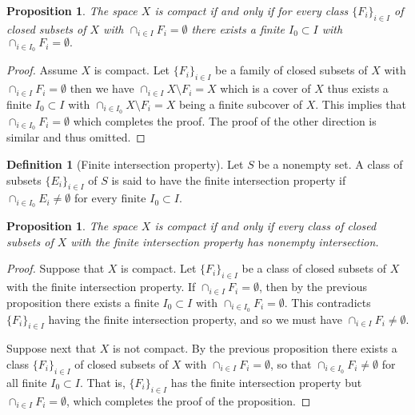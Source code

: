 \documentclass[11pt,a4paper]{article}
\theoremstyle{definition}
\newtheorem{definition}{Definition}[section]
\theoremstyle{plain}
\newtheorem{proposition}[theorem]{Proposition}
\begin{document}
  \begin{proposition}\label{prp:fip}
    The space $X$ is compact if and only if for every class 
    $\{F_i\}_{i \in I}$ of closed subsets of $X$ with 
    $\cap_{i \in I}{F_i} = \emptyset$ there exists a finite 
    $I_0 \subset I$ with $\cap_{i \in I_0} {F_i} = \emptyset.$
  \end{proposition}
  \begin{proof}
    Assume $X$ is compact. Let $\{F_i\}_{i \in I}$ be a family of closed 
    subsets of $X$ with $\cap_{i \in I}{F_i} = \emptyset$ then 
    we have
    $\cap_{i \in I} {X \setminus F_i} = X$ which is a cover of $X$
    thus exists a finite $I_0 \subset I$ with 
    $\cap_{i \in I_0} {X \setminus F_i} = X$ being a finite subcover
    of $X$. This implies that $\cap_{i \in I_0} {F_i} = \emptyset$
    which completes the proof. The proof of the other direction is
    similar and thus omitted. 
  \end{proof}

  \begin{definition}[Finite intersection property]
    Let $S$ be a nonempty set. A class of subsets $\{E_i\}_{i \in I}$ of 
    $S$ is said to have the finite intersection property if 
    $\cap_{i \in I_0}{E_i} \neq \emptyset$ for every finite 
    $I_0 \subset I$.
  \end{definition}

  \begin{proposition}
    The space $X$ is compact if and only if every class of closed
    subsets of $X$ with the finite intersection property has nonempty 
    intersection.
  \end{proposition}
  \begin{proof}
    Suppose that $X$ is compact. Let $\{F_i\}_{i \in I}$ be a class of closed 
    subsets of $X$ with the finite intersection property. 
    If $\cap_{i \in I} F_i = \emptyset$, then by the previous proposition
    there exists a finite $I_0 \subset I$ with 
    $\cap_{i \in I_0} F_i = \emptyset$. 
    This contradicts $\{F_i\}_{i \in I}$ having the finite intersection 
    property, and so we must have $\cap_{i \in I} F_i \neq \emptyset$.

    Suppose next that $X$ is not compact. By the previous proposition there 
    exists a class $\{F_i\}_{i \in I}$ of closed subsets of $X$ 
    with $\cap_{i \in I} F_i = \emptyset$,
    so that $\cap_{i \in I_0} F_i \neq \emptyset$ for all finite
    $I_0 \subset I$. That is, $\{F_i\}_{i \in I}$ has the finite intersection 
    property but $\cap_{i \in I} F_i = \emptyset$, 
    which completes the proof of the proposition.
  \end{proof}
\end{document}
